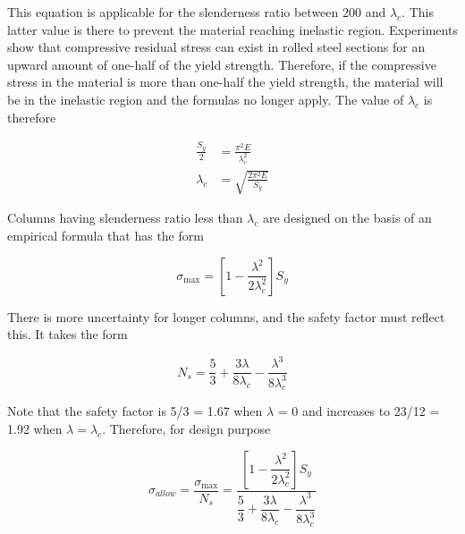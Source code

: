 \documentclass[
10pt,
a4paper,
openany,
svgnames,
]{book}
\begin{document}
This equation is applicable for the slenderness ratio between 200 and $\lambda_c$. This latter value is there to prevent the material reaching inelastic region. Experiments show that compressive residual stress can exist in rolled steel sections for an upward amount of one-half of the yield strength. Therefore, if the compressive stress in the material is more than one-half the yield strength, the material will be in the inelastic region and the formulas no longer apply. The value of $\lambda_c$ is therefore

\begin{align}
  \frac{S_y}{2} &= \frac{\pi ^2E}{\lambda_c^2} \nonumber \\
  \lambda_c &= \sqrt {\frac{2\pi^2E}{S_y}} \label{eq: crit slender ratio for steel column}
\end{align}

Columns having slenderness ratio less than $\lambda_c$ are designed on the basis of an empirical formula that has the form

$$ \sigma _{\max} = \left[ 1 - \frac{\lambda^2}{2\lambda_c^2} \right]S_y $$

There is more uncertainty for longer columns, and the safety factor must reflect this. It takes the form

$$ N_s = \frac{5}{3} + \frac{3\lambda}{8\lambda_c} - \frac{\lambda^3}{8\lambda_c^3} $$

Note that the safety factor is 5/3 = 1.67 when $\lambda$ = 0 and increases to 23/12 = 1.92 when $\lambda = \lambda_c$. Therefore, for design purpose

\begin{equation}
  \label{eq: design eq for steel columns}
  \sigma_{allow} = \frac{\sigma_{\max}}{N_s} = \frac{\left[ 1 - \dfrac{\lambda^2}{2\lambda_c^2} \right] S_y }{\dfrac{5}{3} + \dfrac{ 3\lambda }{8\lambda_c} - \dfrac{\lambda^3}{8\lambda_c^3}}
\end{equation}
\end{document}
